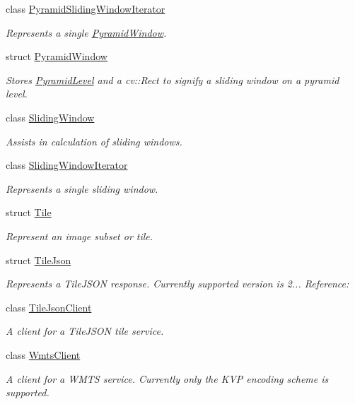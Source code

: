 \begin{DoxyCompactItemize}
class \hyperlink{classdg_1_1deepcore_1_1imagery_1_1_pyramid_sliding_window_iterator}{Pyramid\+Sliding\+Window\+Iterator}
\begin{DoxyCompactList}\small\item\em Represents a single \hyperlink{structdg_1_1deepcore_1_1imagery_1_1_pyramid_window}{Pyramid\+Window}. \end{DoxyCompactList}\item 
struct \hyperlink{structdg_1_1deepcore_1_1imagery_1_1_pyramid_window}{Pyramid\+Window}
\begin{DoxyCompactList}\small\item\em Stores \hyperlink{structdg_1_1deepcore_1_1imagery_1_1_pyramid_level}{Pyramid\+Level} and a cv\+::\+Rect to signify a sliding window on a pyramid level. \end{DoxyCompactList}\item 
class \hyperlink{classdg_1_1deepcore_1_1imagery_1_1_sliding_window}{Sliding\+Window}
\begin{DoxyCompactList}\small\item\em Assists in calculation of sliding windows. \end{DoxyCompactList}\item 
class \hyperlink{classdg_1_1deepcore_1_1imagery_1_1_sliding_window_iterator}{Sliding\+Window\+Iterator}
\begin{DoxyCompactList}\small\item\em Represents a single sliding window. \end{DoxyCompactList}\item 
struct \hyperlink{structdg_1_1deepcore_1_1imagery_1_1_tile}{Tile}
\begin{DoxyCompactList}\small\item\em Represent an image subset or tile. \end{DoxyCompactList}\item 
struct \hyperlink{structdg_1_1deepcore_1_1imagery_1_1_tile_json}{Tile\+Json}
\begin{DoxyCompactList}\small\item\em Represents a Tile\+J\+S\+ON response. Currently supported version is 2... Reference\+: \href{https://github.com/mapbox/tilejson-spec/tree/master/2.0.0}{\tt } \end{DoxyCompactList}\item 
class \hyperlink{classdg_1_1deepcore_1_1imagery_1_1_tile_json_client}{Tile\+Json\+Client}
\begin{DoxyCompactList}\small\item\em A client for a Tile\+J\+S\+ON tile service. \end{DoxyCompactList}\item 
class \hyperlink{classdg_1_1deepcore_1_1imagery_1_1_wmts_client}{Wmts\+Client}
\begin{DoxyCompactList}\small\item\em A client for a W\+M\+TS service. Currently only the K\+VP encoding scheme is supported. \end{DoxyCompactList}\end{DoxyCompactItemize}
